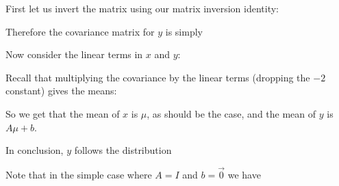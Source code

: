 \documentclass[12pt]{article}
\begin{document}
First let us invert the matrix using our matrix inversion identity:


Therefore the covariance matrix for $y$ is simply 


Now consider the linear terms in $x$ and $y$:

Recall that multiplying the covariance by the linear terms (dropping the $-2$ constant) gives the means:


So we get that the mean of $x$ is $\mu$, as should be the case, and the mean of $y$ is $A \mu +b$.

In conclusion, $y$ follows the distribution


Note that in the simple case where $A = I$ and $b = \vec 0$ we have
\end{document}
